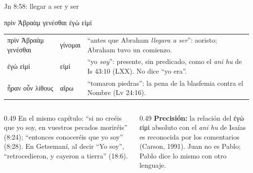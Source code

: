 \documentclass[hyperref={bookmarks=false},aspectratio=169]{beamer}
\newcommand{\grc}[1]{\foreignlanguage{ancientgreek}{#1}}
\newcommand{\precision}[1]{{\footnotesize\color{gris}\textbf{Precisión:} #1}}
\begin{document}
\begin{frame}{Jn 8:58: llegar a ser y ser}
\begin{center}\grc{πρὶν Ἀβραὰμ γενέσθαι ἐγὼ εἰμί}\end{center}
\scriptsize\renewcommand{\arraystretch}{1.15}
\begin{tabular}{@{}>{\RaggedRight\arraybackslash}p{3.0cm}>{\RaggedRight\arraybackslash}p{1.4cm}>{\RaggedRight\arraybackslash}p{7.4cm}@{}}
\toprule
\grc{πρὶν Ἀβραὰμ γενέσθαι} & \grc{γίνομαι} & ``antes que Abraham \emph{llegara a ser}'': aoristo; Abraham tuvo un comienzo. \\
\grc{ἐγὼ εἰμί} & \grc{εἰμί} & ``yo \emph{soy}'': presente, sin predicado, como el \emph{ani hu} de Is 43:10 (LXX). No dice ``yo era''. \\
\grc{ἦραν οὖν λίθους} & \grc{αἴρω} & ``tomaron piedras'': la pena de la blasfemia contra el Nombre (Lv 24:16). \\
\bottomrule
\end{tabular}\par\medskip
\begin{columns}[t,onlytextwidth]
\begin{column}{0.49\textwidth}\scriptsize
En el mismo capítulo: ``si no creéis que yo soy, en vuestros pecados moriréis'' (8:24); ``entonces conoceréis que yo soy'' (8:28). En Getsemaní, al decir ``Yo soy'', ``retrocedieron, y cayeron a tierra'' (18:6).
\end{column}
\begin{column}{0.49\textwidth}
\precision{la relación del \grc{ἐγὼ εἰμί} absoluto con el \emph{ani hu} de Isaías es reconocida por los comentarios (Carson, 1991). Juan no es Pablo; Pablo dice lo mismo con otro lenguaje.}
\end{column}
\end{columns}
\end{frame}
\end{document}
